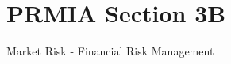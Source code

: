 \documentclass[]{article}
\begin{document}
\section{PRMIA Section 3B}


Market Risk - Financial Risk Management






\end{document}
